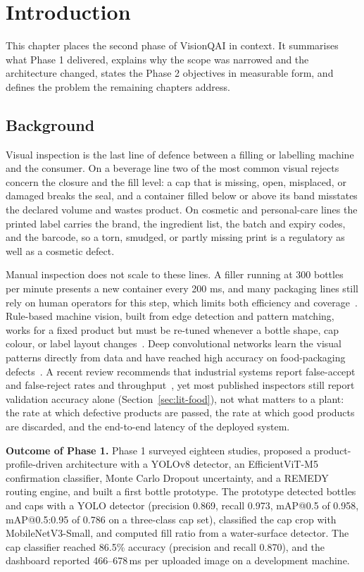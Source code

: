 \chapter{Introduction}
\label{ch:intro}

This chapter places the second phase of VisionQAI in context. It summarises what Phase 1 delivered, explains why the scope was narrowed and the architecture changed, states the Phase 2 objectives in measurable form, and defines the problem the remaining chapters address.

\section{Background}
\label{sec:background}

Visual inspection is the last line of defence between a filling or labelling machine and the consumer. On a beverage line two of the most common visual rejects concern the closure and the fill level: a cap that is missing, open, misplaced, or damaged breaks the seal, and a container filled below or above its band misstates the declared volume and wastes product. On cosmetic and personal-care lines the printed label carries the brand, the ingredient list, the batch and expiry codes, and the barcode, so a torn, smudged, or partly missing print is a regulatory as well as a cosmetic defect.

Manual inspection does not scale to these lines. A filler running at 300 bottles per minute presents a new container every 200 ms, and many packaging lines still rely on human operators for this step, which limits both efficiency and coverage~\cite{banus2021}. Rule-based machine vision, built from edge detection and pattern matching, works for a fixed product but must be re-tuned whenever a bottle shape, cap colour, or label layout changes~\cite{farhangi2024}. Deep convolutional networks learn the visual patterns directly from data and have reached high accuracy on food-packaging defects~\cite{banus2021,liu2025}. A recent review recommends that industrial systems report false-accept and false-reject rates and throughput~\cite{liakos2025}, yet most published inspectors still report validation accuracy alone (Section~\ref{sec:lit-food}), not what matters to a plant: the rate at which defective products are passed, the rate at which good products are discarded, and the end-to-end latency of the deployed system.

\noindent\textbf{Outcome of Phase 1.} Phase 1 surveyed eighteen studies, proposed a product-profile-driven architecture with a YOLOv8 detector, an EfficientViT-M5 confirmation classifier, Monte Carlo Dropout uncertainty, and a REMEDY routing engine, and built a first bottle prototype. The prototype detected bottles and caps with a YOLO detector (precision 0.869, recall 0.973, mAP@0.5 of 0.958, mAP@0.5:0.95 of 0.786 on a three-class cap set), classified the cap crop with MobileNetV3-Small, and computed fill ratio from a water-surface detector. The cap classifier reached 86.5\% accuracy (precision and recall 0.870), and the dashboard reported 466--678\,ms per uploaded image on a development machine.

